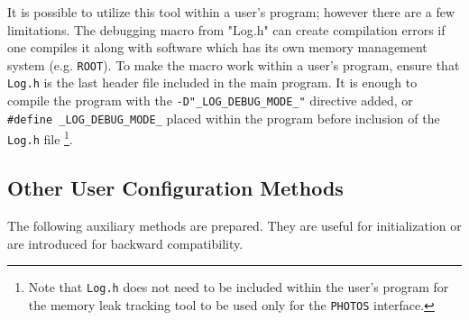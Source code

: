 \documentclass[]{Photos_interface_design}
\begin{document}
It is possible to utilize this tool within a user's program; however there are a few limitations.
The debugging macro from "Log.h" can create compilation errors if one compiles
it along with software which has its own memory management system (e.g. {\tt ROOT}).
To make the macro work within a user's program, ensure that {\tt Log.h} is the last header file
included in the main program.
It is enough to  compile the program with the {\tt -D"\_LOG\_DEBUG\_MODE\_"} directive added,
or {\tt \#define \_LOG\_DEBUG\_MODE\_} placed within the program before inclusion of
 the {\tt Log.h} file%
\footnote{Note that {\tt Log.h} does not need to be included within
the user's program  for the memory leak tracking tool to be used only for the {\tt PHOTOS} interface.
}.

\subsection{Other User Configuration Methods}
\label{subsection:other_methods}

The following auxiliary methods are prepared. They are useful for initialization 
or are introduced for backward compatibility.
\end{document}
